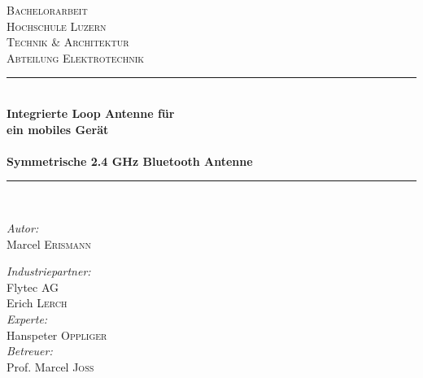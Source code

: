 \begin{titlepage}

\begin{center}

\textsc{\LARGE Bachelorarbeit}\\[1.5cm]

\textsc{ \Large Hochschule Luzern\\
    Technik \& Architektur\\
    Abteilung Elektrotechnik}\\[0.5cm]

\vfill{}

\newcommand{\HRule}{\rule{\linewidth}{0.5mm}}
\HRule \\[0.4cm]
{   \Huge \bfseries Integrierte Loop Antenne für \\ein mobiles Gerät\\
        ~\\
        \large Symmetrische 2.4 GHz Bluetooth Antenne}\\[0.4cm]

\HRule \\[1.5cm]

\begin{minipage}{0.4\textwidth}
    \begin{flushleft} \large
        \emph{Autor:}\\
        Marcel \textsc{Erismann}\\
    \end{flushleft}
\end{minipage}
\hfill
\begin{minipage}{0.4\textwidth}
    \begin{flushright} \large
          \emph{Industriepartner:} \\
         Flytec AG\\
         Erich \textsc{Lerch}\\
         \vspace{0.5cm}
         \emph{Experte:} \\
         Hanspeter  \textsc{Oppliger}\\
         \vspace{0.5cm}
         \emph{Betreuer:} \\
         Prof. Marcel  \textsc{Joss}
    \end{flushright}
\end{minipage}


\end{center}
\end{titlepage}
